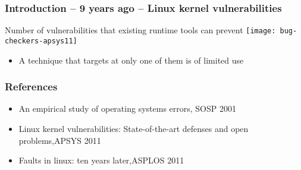 \begin{frame}[plain]
	\frametitle{Introduction -- 9 years ago -- Linux kernel vulnerabilities}
	\centering
	 Number of vulnerabilities that existing runtime tools can prevent
	\texttt{[image: bug-checkers-apsys11]}
	
	\begin{itemize}
	
	\item A technique that targets at only one of them is of limited use	
    \end{itemize}
\end{frame}

\begin{frame}[plain]
	\frametitle{References}

	\begin{itemize}
		
		\item  An empirical study of operating systems errors, SOSP 2001
		\item Linux kernel vulnerabilities: State-of-the-art defenses and open problems,APSYS 2011
		\item  Faults in linux: ten years later,ASPLOS 2011
		
	\end{itemize}
	
	
\end{frame}
